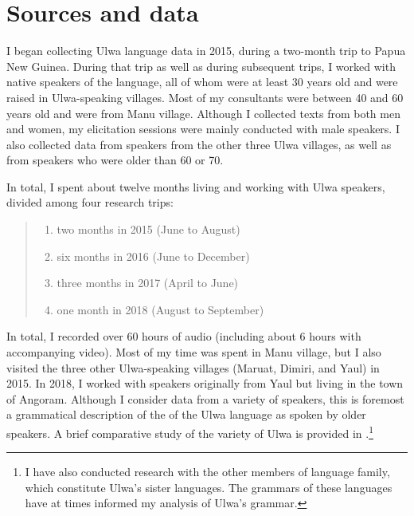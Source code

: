 \section{Sources and data}\label{sec:1.2}

I began collecting Ulwa language data in 2015, during a two-month trip to Papua New Guinea. During that trip as well as during subsequent trips, I worked with native speakers of the language, all of whom were at least 30 years old and were raised in Ulwa-speaking villages. Most of my consultants were between 40 and 60 years old and were from Manu village. Although I collected texts from both men and women, my elicitation sessions were mainly conducted with male speakers. I also collected data from speakers from the other three Ulwa villages, as well as from speakers who were older than 60 or 70.

In total, I spent about twelve months living and working with Ulwa speakers, divided among four research trips:

\begin{quote}
\begin{enumerate}[noitemsep, label={(\roman*)}, align=left, widest=190, labelsep=1ex,leftmargin=*]
\item two months in 2015 (June to August)
\item six months in 2016 (June to December)
\item three months in 2017 (April to June)
\item one month in 2018 (August to September)
\end{enumerate}
\end{quote}

In total, I recorded over 60 hours of audio (including about 6 hours with accompanying video). Most of my time was spent in Manu village, but I also visited the three other Ulwa-speaking villages (Maruat, Dimiri, and Yaul) in 2015. In 2018, I worked with speakers originally from Yaul but living in the town of Angoram. Although I consider data from a variety of speakers, this is foremost a grammatical description of the   of the Ulwa language as spoken by older speakers. A brief comparative study of the  variety of Ulwa is provided in .\footnote{I have also conducted research with the other members of  language family, which constitute Ulwa’s sister languages. The grammars of these languages have at times informed my analysis of Ulwa’s grammar.}

